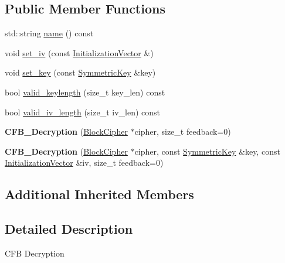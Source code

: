 \subsection*{Public Member Functions}
\begin{DoxyCompactItemize}
\item 
std\-::string \hyperlink{classBotan_1_1CFB__Decryption_ac5a39f21b97b0e11a73d50de7aa8eb56}{name} () const 
\item 
void \hyperlink{classBotan_1_1CFB__Decryption_aafe662ddaa7e35bc2f7f06a1eee0e0f0}{set\-\_\-iv} (const \hyperlink{namespaceBotan_ab6a07e859c4e3a2ccfd68308ec89497e}{Initialization\-Vector} \&)
\item 
void \hyperlink{classBotan_1_1CFB__Decryption_af478cb2904c8eefc4f18d8e5266a3f80}{set\-\_\-key} (const \hyperlink{namespaceBotan_a00c78597211d5c63b63e2a57ddb96d38}{Symmetric\-Key} \&key)
\item 
bool \hyperlink{classBotan_1_1CFB__Decryption_a98250ca8d2731a3b3ebee7222467caae}{valid\-\_\-keylength} (size\-\_\-t key\-\_\-len) const 
\item 
bool \hyperlink{classBotan_1_1CFB__Decryption_adeda8a1119563a7964c205b6dbbaf3f0}{valid\-\_\-iv\-\_\-length} (size\-\_\-t iv\-\_\-len) const 
\item 
\hypertarget{classBotan_1_1CFB__Decryption_a2edad0bc8103b9d04f08e2ff910bf421}{{\bfseries C\-F\-B\-\_\-\-Decryption} (\hyperlink{classBotan_1_1BlockCipher}{Block\-Cipher} $\ast$cipher, size\-\_\-t feedback=0)}\label{classBotan_1_1CFB__Decryption_a2edad0bc8103b9d04f08e2ff910bf421}

\item 
\hypertarget{classBotan_1_1CFB__Decryption_a551fe3869e252dbafcf8df5a6b5065ed}{{\bfseries C\-F\-B\-\_\-\-Decryption} (\hyperlink{classBotan_1_1BlockCipher}{Block\-Cipher} $\ast$cipher, const \hyperlink{namespaceBotan_a00c78597211d5c63b63e2a57ddb96d38}{Symmetric\-Key} \&key, const \hyperlink{namespaceBotan_ab6a07e859c4e3a2ccfd68308ec89497e}{Initialization\-Vector} \&iv, size\-\_\-t feedback=0)}\label{classBotan_1_1CFB__Decryption_a551fe3869e252dbafcf8df5a6b5065ed}

\end{DoxyCompactItemize}
\subsection*{Additional Inherited Members}


\subsection{Detailed Description}
C\-F\-B Decryption 

